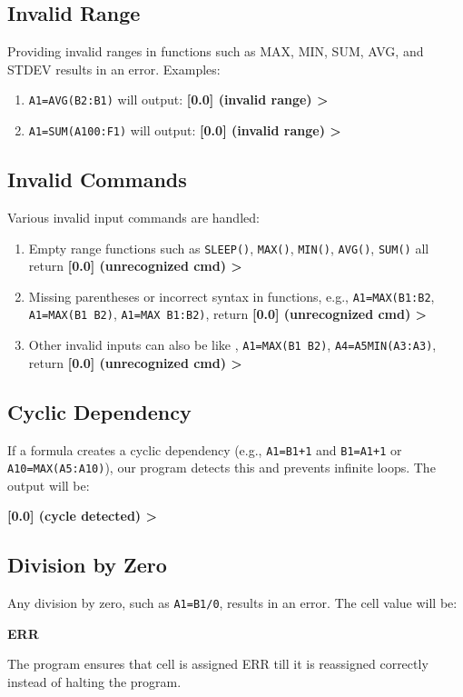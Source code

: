 \documentclass[a4paper]{article}
\begin{document}
\subsection{Invalid Range}
Providing invalid ranges in functions such as MAX, MIN, SUM, AVG, and STDEV results in an error. Examples:
\begin{enumerate}
    \item \texttt{A1=AVG(B2:B1)} will output: \textbf{[0.0] (invalid range) >}
    \item \texttt{A1=SUM(A100:F1)} will output: \textbf{[0.0] (invalid range) >}
\end{enumerate}

\subsection{Invalid Commands}
Various invalid input commands are handled:
\begin{enumerate}
    \item Empty range functions such as \texttt{SLEEP()}, \texttt{MAX()}, \texttt{MIN()}, \texttt{AVG()}, \texttt{SUM()} all return \textbf{[0.0] (unrecognized cmd) >}
    \item Missing parentheses or incorrect syntax in functions, e.g., \texttt{A1=MAX(B1:B2}, \texttt{A1=MAX(B1 B2)}, \texttt{A1=MAX B1:B2)}, return \textbf{[0.0] (unrecognized cmd) >}
    \item Other invalid inputs can also be like
    , \texttt{A1=MAX(B1 B2)}, \texttt{A4=A5MIN(A3:A3)}, return \textbf{[0.0] (unrecognized cmd) >}
\end{enumerate}

\subsection{Cyclic Dependency}
If a formula creates a cyclic dependency (e.g., \texttt{A1=B1+1} and \texttt{B1=A1+1} or \texttt{A10=MAX(A5:A10)}), our program detects this and prevents infinite loops. The output will be:
\begin{center}
    \textbf{[0.0] (cycle detected) >}
\end{center}

\subsection{Division by Zero}
Any division by zero, such as \texttt{A1=B1/0}, results in an error. The cell value will be:
\begin{center}
    \textbf{ERR}
\end{center}
The program ensures that cell is assigned ERR till it is reassigned correctly instead of halting the program.
\end{document}
